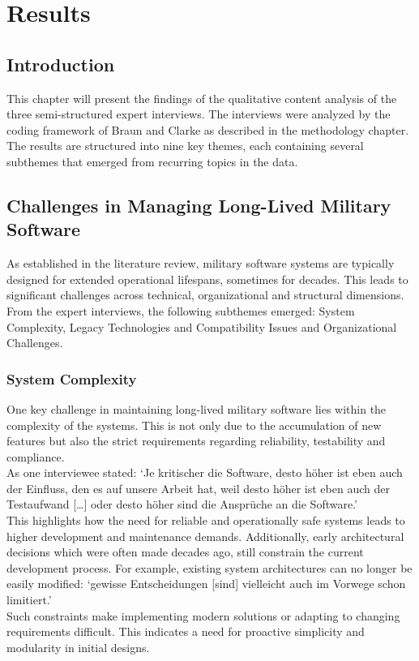 \section{Results}
\subsection{Introduction}
This chapter will present the findings of the qualitative content analysis of the three semi-structured expert interviews. The interviews were analyzed by the coding framework of Braun and Clarke as described in the methodology chapter.
The results are structured into nine key themes, each containing several subthemes that emerged from recurring topics in the data.
\subsection{Challenges in Managing Long-Lived Military Software}
As established in the literature review, military software systems are typically designed for extended operational lifespans, sometimes for decades. This leads to significant challenges across technical, organizational and structural dimensions.
From the expert interviews, the following subthemes emerged: System Complexity, Legacy Technologies and Compatibility Issues and Organizational Challenges.

\subsubsection{System Complexity}
One key challenge in maintaining long-lived military software lies within the complexity of the systems. This is not only due to the accumulation of new features but also the strict requirements regarding reliability, testability and compliance.\\

As one interviewee stated: `Je kritischer die Software, desto höher ist eben auch der Einfluss, den es auf unsere Arbeit hat, weil desto höher ist eben auch der Testaufwand [\ldots] oder desto höher sind die Ansprüche an die Software.'\\

This highlights how the need for reliable and operationally safe systems leads to higher development and maintenance demands. Additionally, early architectural decisions which were often made decades ago, 
still constrain the current development process. For example, existing system architectures can no longer be easily modified: `gewisse Entscheidungen [sind] vielleicht auch im Vorwege schon limitiert.'\\
Such constraints make implementing modern solutions or adapting to changing requirements difficult. This indicates a need for proactive simplicity and modularity in initial designs.

